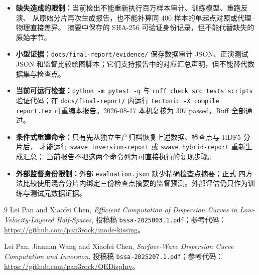 \documentclass[UTF8,a4paper,11pt]{ctexart}
\begin{document}
\begin{sloppypar}
\begin{itemize}
      耗时也未归档。
\item \textbf{缺失造成的限制：}当前检出不能重新执行百万样本审计、训练模型、重跑反演、
      从原始分片再次生成报告，也不能补算同 400 样本的单起点对照或代理--物理直接差异。
      摘要中保存的 SHA-256 可验证身份记录，但不能代替缺失的原始字节。
\item \textbf{小型证据：}\texttt{docs/final-report/evidence/} 保存数据审计 JSON、正演测试
      JSON 和监督比较绘图脚本；它们支持报告中的对应汇总声明，但不能替代数据集与检查点。
\item \textbf{当前可运行检查：}\texttt{python -m pytest -q} 与
      \texttt{ruff check src tests scripts} 验证代码；在 \texttt{docs/final-report/} 内运行
      \texttt{tectonic -X compile report.tex} 可重编本报告。2026-08-17 本机复核为
      307 passed，Ruff 全部通过。
\item \textbf{条件式重建命令：}只有先从独立生产归档恢复上述数据、检查点与 HDF5 分片后，
      才能运行 \texttt{swave inversion-report} 或 \texttt{swave hybrid-report} 重新生成汇总；
      当前报告不把这两个命令列为可直接执行的复现步骤。
\item \textbf{外部监督身份限制：}外部 \texttt{evaluation.json} 缺少精确检查点摘要；正式
      四方法比较使用混合分片内绑定三份检查点摘要的监督预测。外部评估仍只作为训练与测试元数据证据。
\end{itemize}
\end{sloppypar}

\begin{thebibliography}{9}
Lei Pan and Xiaofei Chen,
\emph{Efficient Computation of Dispersion Curves in Low-Velocity-Layered Half-Spaces},
投稿稿 \texttt{bssa-2025003.1.pdf}；参考代码：
\url{https://github.com/pan3rock/mode-kissing}。

Lei Pan, Jiannan Wang and Xiaofei Chen,
\emph{Surface-Wave Dispersion Curve Computation and Inversion},
投稿稿 \texttt{bssa-2025207.1.pdf}；参考代码：
\url{https://github.com/pan3rock/QEDispInv}。
\end{thebibliography}
\end{document}
